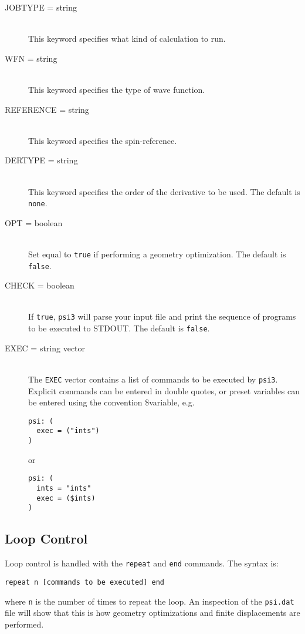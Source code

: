 \begin{description}

\item[JOBTYPE = string]\mbox{}\\
This keyword specifies what kind of calculation to run.

\item[WFN = string]\mbox{}\\
This keyword specifies the type of wave function.

\item[REFERENCE = string]\mbox{}\\
This keyword specifies the spin-reference.

\item[DERTYPE = string]\mbox{}\\
This keyword specifies the order of the derivative to be used.
The default is {\tt none}.

\item[OPT = boolean]\mbox{}\\
Set equal to {\tt true} if performing a geometry optimization.
The default is {\tt false}.

\item[CHECK = boolean]\mbox{}\\
If {\tt true}, {\tt psi3} will parse your input file and print
the sequence of programs to be executed to STDOUT. The default is 
{\tt false}.

\item[EXEC = string vector]\mbox{}\\
The {\tt EXEC} vector contains a list of commands to be executed by
{\tt psi3}. Explicit commands can be entered in double quotes, or
preset variables can be entered using the convention \$variable, 
e.g.
\begin{verbatim}
psi: (
  exec = ("ints")
)
\end{verbatim}
or
\begin{verbatim}
psi: (
  ints = "ints"
  exec = ($ints)
)
\end{verbatim}

\end{description}

\subsection{Loop Control}

Loop control is handled with the {\tt repeat} and {\tt end} commands.
The syntax is:
\begin{verbatim}
repeat n [commands to be executed] end
\end{verbatim}
where {\tt n} is the number of times to repeat the loop. An inspection
of the {\tt psi.dat} file will show that this is how geometry optimizations
and finite displacements are performed.
